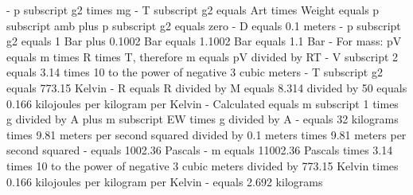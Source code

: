 - p subscript g2 times mg
- T subscript g2 equals Art times Weight equals p subscript amb plus p subscript g2 equals zero
- D equals 0.1 meters
- p subscript g2 equals 1 Bar plus 0.1002 Bar equals 1.1002 Bar equals 1.1 Bar
- For mass: pV equals m times R times T, therefore m equals pV divided by RT
- V subscript 2 equals 3.14 times 10 to the power of negative 3 cubic meters
- T subscript g2 equals 773.15 Kelvin
- R equals R divided by M equals 8.314 divided by 50 equals 0.166 kilojoules per kilogram per Kelvin
- Calculated equals m subscript 1 times g divided by A plus m subscript EW times g divided by A
- equals 32 kilograms times 9.81 meters per second squared divided by 0.1 meters times 9.81 meters per second squared
- equals 1002.36 Pascals
- m equals 11002.36 Pascals times 3.14 times 10 to the power of negative 3 cubic meters divided by 773.15 Kelvin times 0.166 kilojoules per kilogram per Kelvin
- equals 2.692 kilograms